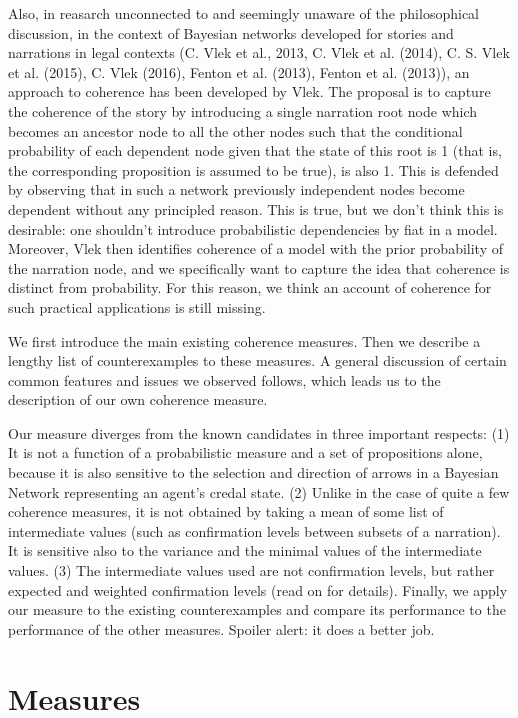 \documentclass[10pt,]{scrartcl}
\begin{document}
Also, in reasarch unconnected to and seemingly unaware of the
philosophical discussion, in the context of Bayesian networks developed
for stories and narrations in legal contexts (C. Vlek et al., 2013, C.
Vlek et al. (2014), C. S. Vlek et al. (2015), C. Vlek (2016), Fenton et
al. (2013), Fenton et al. (2013)), an approach to coherence has been
developed by Vlek. The proposal is to capture the coherence of the story
by introducing a single narration root node which becomes an ancestor
node to all the other nodes such that the conditional probability of
each dependent node given that the state of this root is 1 (that is, the
corresponding proposition is assumed to be true), is also 1. This is
defended by observing that in such a network previously independent
nodes become dependent without any principled reason. This is true, but
we don't think this is desirable: one shouldn't introduce probabilistic
dependencies by fiat in a model. Moreover, Vlek then identifies
coherence of a model with the prior probability of the narration node,
and we specifically want to capture the idea that coherence is distinct
from probability. For this reason, we think an account of coherence for
such practical applications is still missing.

We first introduce the main existing coherence measures. Then we
describe a lengthy list of counterexamples to these measures. A general
discussion of certain common features and issues we observed follows,
which leads us to the description of our own coherence measure.

Our measure diverges from the known candidates in three important
respects: (1) It is not a function of a probabilistic measure and a set
of propositions alone, because it is also sensitive to the selection and
direction of arrows in a Bayesian Network representing an agent's credal
state. (2) Unlike in the case of quite a few coherence measures, it is
not obtained by taking a mean of some list of intermediate values (such
as confirmation levels between subsets of a narration). It is sensitive
also to the variance and the minimal values of the intermediate values.
(3) The intermediate values used are not confirmation levels, but rather
expected and weighted confirmation levels (read on for details).
Finally, we apply our measure to the existing counterexamples and
compare its performance to the performance of the other measures.
Spoiler alert: it does a better job.

\section{Measures}
\end{document}
